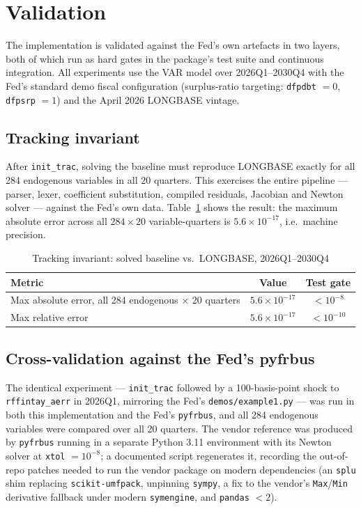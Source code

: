 \section{Validation}
\label{sec:validation}

The implementation is validated against the Fed's own artefacts in two layers, both of which run as hard gates in the package's test suite and continuous integration. All experiments use the VAR model over 2026Q1--2030Q4 with the Fed's standard demo fiscal configuration (surplus-ratio targeting: \texttt{dfpdbt} $=0$, \texttt{dfpsrp} $=1$) and the April 2026 LONGBASE vintage.

\subsection{Tracking invariant}

After \texttt{init\_trac}, solving the baseline must reproduce LONGBASE exactly for all 284 endogenous variables in all 20 quarters. This exercises the entire pipeline --- parser, lexer, coefficient substitution, compiled residuals, Jacobian and Newton solver --- against the Fed's own data. Table~\ref{tab:tracking} shows the result: the maximum absolute error across all $284\times20$ variable-quarters is $5.6\times10^{-17}$, i.e.\ machine precision.

\begin{table}[htbp]
\centering
\caption{Tracking invariant: solved baseline vs.\ LONGBASE, 2026Q1--2030Q4}
\label{tab:tracking}
\begin{tabular}{lcc}
\toprule
Metric & Value & Test gate \\
\midrule
Max absolute error, all 284 endogenous $\times$ 20 quarters & $5.6\times10^{-17}$ & $<10^{-8}$ \\
Max relative error & $5.6\times10^{-17}$ & $<10^{-10}$ \\
\bottomrule
\end{tabular}
\end{table}

\subsection{Cross-validation against the Fed's pyfrbus}

The identical experiment --- \texttt{init\_trac} followed by a 100-basis-point shock to \texttt{rffintay\_aerr} in 2026Q1, mirroring the Fed's \texttt{demos/example1.py} --- was run in both this implementation and the Fed's \texttt{pyfrbus}, and all 284 endogenous variables were compared over all 20 quarters. The vendor reference was produced by \texttt{pyfrbus} running in a separate Python 3.11 environment with its Newton solver at \texttt{xtol} $=10^{-8}$; a documented script regenerates it, recording the out-of-repo patches needed to run the vendor package on modern dependencies (an \texttt{splu} shim replacing \texttt{scikit-umfpack}, unpinning \texttt{sympy}, a fix to the vendor's \texttt{Max}/\texttt{Min} derivative fallback under modern \texttt{symengine}, and \texttt{pandas} $<2$).

